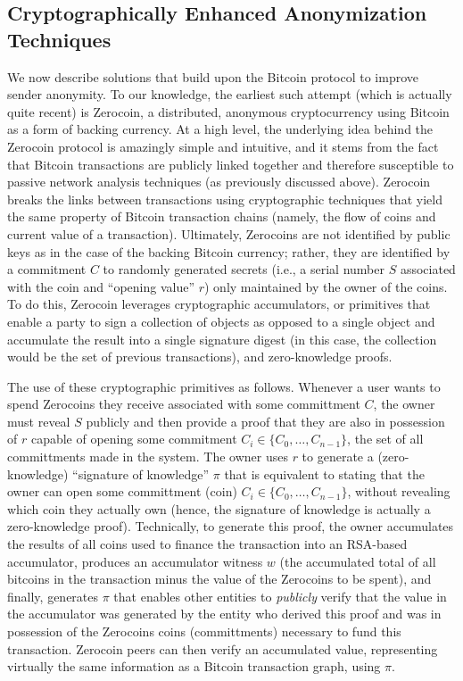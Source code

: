\subsection{Cryptographically Enhanced Anonymization Techniques}
We now describe solutions that build upon the Bitcoin protocol to improve sender anonymity. To our knowledge, the earliest such attempt (which is actually quite recent) is Zerocoin, a distributed, anonymous cryptocurrency using Bitcoin as a form of backing currency. At a high level, the underlying idea behind the Zerocoin protocol is amazingly simple and intuitive, and it stems from the fact that Bitcoin transactions are publicly linked together and therefore susceptible to passive network analysis techniques (as previously discussed above). Zerocoin breaks the links between transactions using cryptographic techniques that yield the same property of Bitcoin transaction chains (namely, the flow of coins and current value of a transaction). Ultimately, Zerocoins are not identified by public keys as in the case of the backing Bitcoin currency; rather, they are identified by a commitment $C$ to randomly generated secrets (i.e., a serial number $S$ associated with the coin and ``opening value'' $r$) only maintained by the owner of the coins. To do this, Zerocoin leverages cryptographic accumulators, or primitives that enable a party to sign a collection of objects as opposed to a single object and accumulate the result into a single signature digest (in this case, the collection would be the set of previous transactions), and zero-knowledge proofs. 

The use of these cryptographic primitives as follows. Whenever a user wants to spend Zerocoins they receive associated with some committment $C$, the owner must reveal $S$ publicly and then provide a proof that they are also in possession of $r$ capable of opening some commitment $C_i \in \{C_0,\dots,C_{n-1}\}$, the set of all committments made in the system. The owner uses $r$ to generate a (zero-knowledge) ``signature of knowledge'' $\pi$ that is equivalent to stating that the owner can open some committment (coin) $C_i \in \{C_0,\dots,C_{n-1}\}$, without revealing which coin they actually own (hence, the signature of knowledge is actually a zero-knowledge proof). Technically, to generate this proof, the owner accumulates the results of all coins used to finance the transaction into an RSA-based accumulator, produces an accumulator witness $w$ (the accumulated total of all bitcoins in the transaction minus the value of the Zerocoins to be spent), and finally, generates $\pi$ that enables other entities to \emph{publicly} verify that the value in the accumulator was generated by the entity who derived this proof and was in possession of the Zerocoins coins (committments) necessary to fund this transaction. Zerocoin peers can then verify an accumulated value, representing virtually the same information as a Bitcoin transaction graph, using $\pi$.

